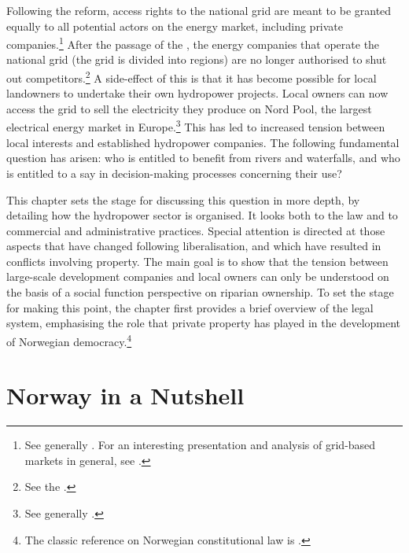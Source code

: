 Following the reform, access rights to the national grid are meant to be granted equally to all potential actors on the energy market, including private companies.\footnote{See generally \cite{hammer96}. For an interesting presentation and analysis of grid-based markets in general, see \cite{falch04}.} After the passage of the \cite{ea90}, the energy companies that operate the national grid (the grid is divided into regions) are no longer authorised to shut out competitors.\footnote{See the \dni\cite[3-4]{ea90}.} A side-effect of this is that it has become possible for local landowners to undertake their own hydropower projects. Local owners can now access the grid to sell the electricity they produce on Nord Pool, the largest electrical energy market in Europe.\footnote{See generally \cite{larsen06,larsen08,larsen12}.} This has led to increased tension between local interests and established hydropower companies. The following fundamental question has arisen: who is entitled to benefit from rivers and waterfalls, and who is entitled to a say in decision-making processes concerning their use?

This chapter sets the stage for discussing this question in more depth, by detailing how the hydropower sector is organised. It looks both to the law and to commercial and administrative practices. Special attention is directed at those aspects that have changed following liberalisation, and which have resulted in conflicts involving property. The main goal is to show that the tension between large-scale development companies and local owners can only be understood on the basis of a social function perspective on riparian ownership. To set the stage for making this point, the chapter first provides a brief overview of the legal system, emphasising the role that private property has played in the development of Norwegian democracy.\footnote{The classic reference on Norwegian constitutional law is \cite{andenes06}.}

\section{Norway in a Nutshell}\label{sec:4:2}

